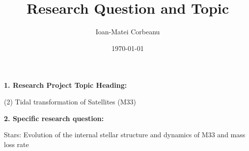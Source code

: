 \documentclass{article}
\title{Research Question and Topic}
\author{Ioan-Matei Corbeanu}
\date{\today}
\begin{document}
\maketitle

\noindent \textbf{1. Research Project Topic Heading:}

\indent (2) Tidal transformation of Satellites (M33)
	
\noindent \textbf{2. Specific research question:}
	
\indent Stars: Evolution of the internal stellar structure and dynamics of M33 and mass loss rate
\end{document}
